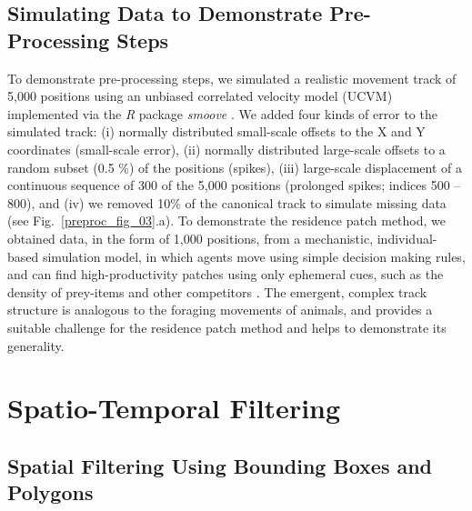     \subsection*{Simulating Data to Demonstrate Pre-Processing Steps}

    To demonstrate pre-processing steps, we simulated a realistic movement track of 5,000 positions using an unbiased correlated velocity model (UCVM) implemented via the \textit{R} package \textit{smoove} \citep[][see Fig.~\ref{preproc_fig_03}.a]{gurarie2017}.
    We added four kinds of error to the simulated track: (i) normally distributed small-scale offsets to the X and Y coordinates (small-scale error), (ii) normally distributed large-scale offsets to a random subset (0.5 \%) of the positions (spikes), (iii) large-scale displacement of a continuous sequence of 300 of the 5,000 positions (prolonged spikes; indices 500 -- 800), and (iv) we removed 10\% of the canonical track to simulate missing data (see Fig.~\ref{preproc_fig_03}.a).
    To demonstrate the residence patch method, we obtained data, in the form of 1,000 positions, from a mechanistic, individual-based simulation model, in which agents move using simple decision making rules, and can find high-productivity patches using only ephemeral cues, such as the density of prey-items and other competitors \citep{gupte2021a, netz2022}.
    The emergent, complex track structure is analogous to the foraging movements of animals, and provides a suitable challenge for the residence patch method and helps to demonstrate its generality.

    \section*{Spatio-Temporal Filtering}

    \subsection*{Spatial Filtering Using Bounding Boxes and Polygons}

